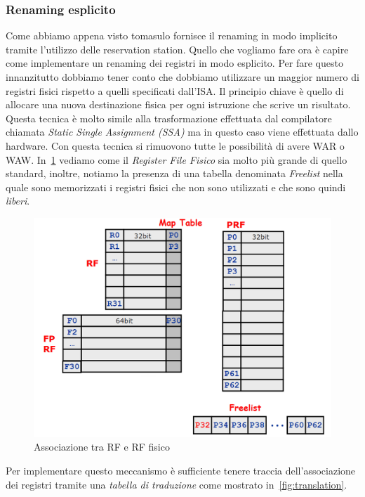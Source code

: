 \subsubsection{Renaming esplicito}
Come abbiamo appena visto tomasulo fornisce il renaming in modo implicito tramite l'utilizzo delle reservation station. Quello che vogliamo fare ora è capire come implementare un renaming dei registri in modo esplicito. Per fare questo innanzitutto dobbiamo tener conto che dobbiamo utilizzare un maggior numero di registri fisici rispetto a quelli specificati dall'ISA. Il principio chiave è quello di allocare una nuova destinazione fisica per ogni istruzione che scrive un risultato. Questa tecnica è molto simile alla trasformazione effettuata dal compilatore chiamata \emph{Static Single Assignment (SSA)} ma in questo caso viene effettuata dallo hardware. Con questa tecnica si rimuovono tutte le possibilità di avere WAR o WAW. In \figurename\,\ref{fig:rftoprf} vediamo come il \emph{Register File Fisico} sia molto più grande di quello standard, inoltre, notiamo la presenza di una tabella denominata \emph{Freelist} nella quale sono memorizzati i registri fisici che non sono utilizzati e che sono quindi \emph{liberi}. 
\begin{figure}[htb]
\centering
\includegraphics[scale=0.5]{img/rftoprf.png}
\caption{Associazione tra RF e RF fisico}\label{fig:rftoprf}
\end{figure}
Per implementare questo meccanismo è sufficiente tenere traccia dell'associazione dei registri tramite una \emph{tabella di traduzione} come mostrato in \figurename\,\ref{fig:translation}.
